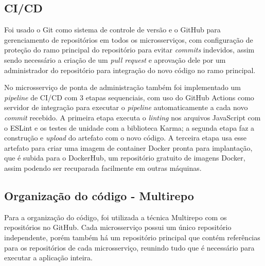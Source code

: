 \subsection*{CI/CD}
Foi usado o Git como sistema de controle de versão e o GitHub para gerenciamento de repositórios em todos os microsserviços, com configuração de proteção do ramo principal do repositório para evitar \emph{commits} indevidos, assim sendo necessário a criação de um \emph{pull request} e aprovação dele por um administrador do repositório para integração do novo código no ramo principal. 

No microsserviço de ponta de administração também foi implementado um \emph{pipeline} de CI/CD com 3 etapas sequenciais, com uso do GitHub Actions como servidor de integração para executar o \emph{pipeline} automaticamente a cada novo \emph{commit} recebido. A primeira etapa executa o \emph{linting} nos arquivos JavaScript com o ESLint e os testes de unidade com a biblioteca Karma; a segunda etapa faz a construção e \emph{upload} do artefato com o novo código. A terceira etapa usa esse artefato para criar uma imagem de container Docker pronta para implantação, que é subida para o DockerHub, um repositório gratuito de imagens Docker, assim podendo ser recuparada facilmente em outras máquinas. 


\subsection*{Organização do código - Multirepo}
Para a organização do código, foi utilizada a técnica Multirepo com os repositórios no GitHub. Cada microsserviço possui um único repositório independente, porém também há um repositório principal que contém referências para os repositórios de cada microsserviço, reunindo tudo que é necessário para executar a aplicação inteira.




